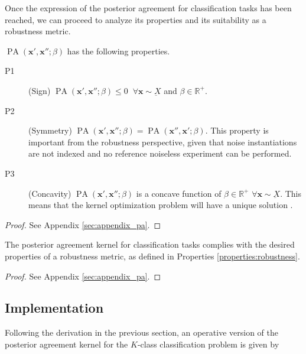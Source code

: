 Once the expression of the posterior agreement for classification tasks has been reached,
we can proceed to analyze its properties and its suitability as a robustness metric. 


\begin{theorem}\label{theorem:pa_properties}
    $\operatorname{PA}\left(\bm{x}', \bm{x}'' ; \beta\right)$ has the following properties.

    \begin{description}
        \item[P1](Sign) $\operatorname{PA}\left(\bm{x}', \bm{x}'' ; \beta\right) \leq 0 \;\; \forall \bm{x} \sim \underbar{X}$ and $\beta \in \mathbb{R}^+$.
        \item[P2](Symmetry)  $\operatorname{PA}\left(\bm{x}', \bm{x}'' ; \beta\right) = \operatorname{PA}\left(\bm{x}'', \bm{x}'; \beta\right)$. This property is 
        important from the robustness perspective, given that noise
        instantiations are not indexed and no reference noiseless experiment can be performed.
        \item[P3](Concavity) $\operatorname{PA}\left(\bm{x}', \bm{x}'' ; \beta\right)$ is a concave function of $\beta \in \mathbb{R}^+$ $\forall \bm{x} \sim \underbar{X}$. This means that 
        the kernel optimization problem will have a unique solution
        \cite{boydConvexOptimization2004}.
    \end{description}
\end{theorem}

\begin{proof}
    See Appendix \ref{sec:appendix_pa}.
\end{proof}

\begin{theorem}
    The posterior agreement kernel for classification tasks complies with the desired 
    properties of a robustness metric, as defined in Properties \ref{properties:robustness}.
\end{theorem}
\begin{proof}
    See Appendix \ref{sec:appendix_pa}.
\end{proof}

\subsection{Implementation}

Following the derivation in the previous section, an operative version of the 
posterior agreement kernel for the $K$-class classification problem is given by

